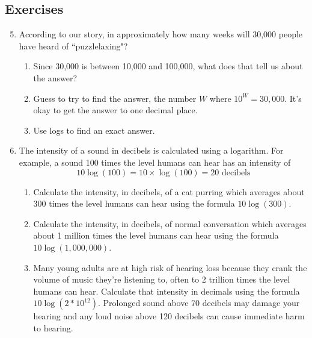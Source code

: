 \subsection*{Exercises}



\begin{enumerate} 
\setcounter{enumi}{4}

\item According to our story, in approximately how many weeks will 30,000 people have heard of ``puzzlelaxing"?
\begin{enumerate}
\item Since 30,000 is between 10,000 and 100,000, what does that tell us about the answer?
\item Guess to try to find the answer, the number $W$ where $10^W = 30,000$.  It's okay to get the answer to one decimal place.
\item Use logs to find an exact answer.
\end{enumerate}

\item The intensity of a sound in decibels is calculated using a logarithm.  For example, a sound 100 times the level humans can hear has an intensity of 
$$10\log (100)= 10 \times \log(100)= 20\text{ decibels}$$
\begin{enumerate}
\item Calculate the intensity, in decibels, of a cat purring which averages about 300 times the level humans can hear using the formula $10\log(300)$.
\item Calculate the intensity, in decibels, of normal conversation which averages about 1 million times the level humans can hear using the formula $10\log(1,000,000)$.
\item Many young adults are at high risk of hearing loss because they crank the volume of music they're listening to, often to 2 trillion times the level humans can hear.  Calculate that intensity in decimals using the formula $10\log(2 \ast10^{12})$. Prolonged sound above 70 decibels may damage your hearing and any loud noise above 120 decibels can cause immediate harm to hearing.
\end{enumerate}


\end{enumerate}
